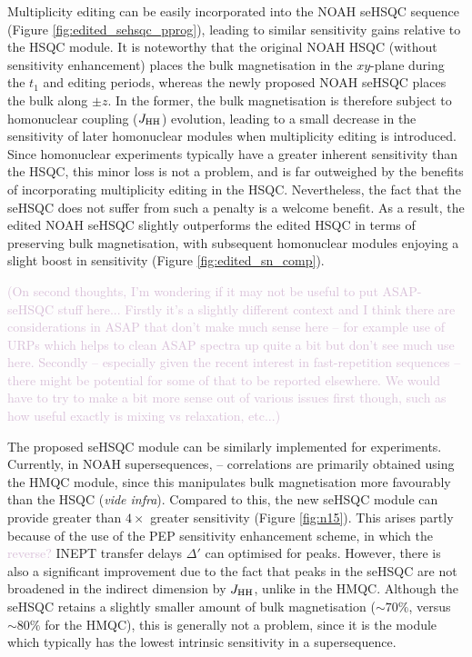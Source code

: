 \documentclass[11pt]{article}
\newcommand*{\proton}{\ce{^{1}H}}
\newcommand*{\nitrogen}{\ce{^{15}N}}
\newcommand*{\hl}[1]{\textcolor{Thistle}{#1}}
\newcommand*{\jhh}{J_{\ce{HH}}}
\newcommand*{\figref}[1]{Figure \ref{fig:#1}}
\begin{document}
Multiplicity editing can be easily incorporated into the NOAH seHSQC sequence (\figref{edited_sehsqc_pprog}), leading to similar sensitivity gains relative to the HSQC module.
It is noteworthy that the original NOAH HSQC (without sensitivity enhancement) places the bulk magnetisation in the $xy$-plane during the $t_1$ and editing periods, whereas the newly proposed NOAH seHSQC places the bulk along $\pm z$.
In the former, the bulk magnetisation is therefore subject to homonuclear coupling ($\jhh$) evolution, leading to a small decrease in the sensitivity of later homonuclear modules when multiplicity editing is introduced.
Since homonuclear experiments typically have a greater inherent sensitivity than the HSQC, this minor loss is not a problem, and is far outweighed by the benefits of incorporating multiplicity editing in the HSQC.
Nevertheless, the fact that the seHSQC does not suffer from such a penalty is a welcome benefit.
As a result, the edited NOAH seHSQC slightly outperforms the edited HSQC in terms of preserving bulk magnetisation, with subsequent homonuclear modules enjoying a slight boost in sensitivity (\figref{edited_sn_comp}).

\hl{(On second thoughts, I'm wondering if it may not be useful to put ASAP-seHSQC stuff here...
    Firstly it's a slightly different context and I think there are considerations in ASAP that don't make much sense here -- for example use of URPs which helps to clean ASAP spectra up quite a bit but don't see much use here.
    Secondly -- especially given the recent interest in fast-repetition sequences -- there might be potential for some of that to be reported elsewhere.
    We would have to try to make a bit more sense out of various issues first though, such as how useful exactly is mixing vs relaxation, etc...)}


The proposed seHSQC module can be similarly implemented for \nitrogen{} experiments.
Currently, in NOAH supersequences, \nitrogen{}--\proton{} correlations are primarily obtained using the HMQC module, since this manipulates bulk magnetisation more favourably than the HSQC (\textit{vide infra}).\autocite{Kupce2007MRC, Kupce2017ACIE}
Compared to this, the new seHSQC module can provide greater than $4\times$ greater sensitivity (\figref{n15}).
This arises partly because of the use of the PEP sensitivity enhancement scheme, in which the \hl{reverse?} INEPT transfer delays $\Delta'$ can optimised for  peaks.
However, there is also a significant improvement due to the fact that peaks in the \nitrogen{} seHSQC are not broadened in the indirect dimension by $\jhh$, unlike in the HMQC.
Although the seHSQC retains a slightly smaller amount of bulk magnetisation ($\sim 70\%$, versus $\sim 80\%$ for the HMQC), this is generally not a problem, since it is the \nitrogen{} module which typically has the lowest intrinsic sensitivity in a supersequence.
\end{document}
